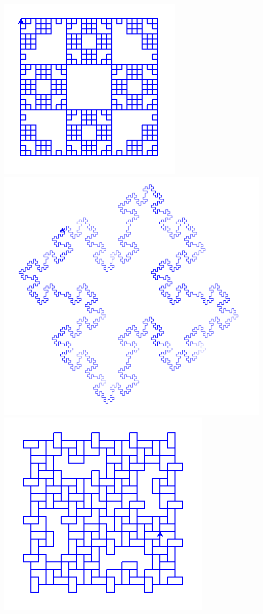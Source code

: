 \documentclass[11pt,class=report,crop=false]{standalone}
\begin{document}
\begin{activite}
\begin{enumerate}
\begin{center}
\includegraphics[scale=\myscale,scale=0.3]{ecran-lsysteme-4}\quad
\includegraphics[scale=\myscale,scale=0.2]{ecran-lsysteme-5}\quad
\includegraphics[scale=\myscale,scale=0.27]{ecran-lsysteme-6}
\end{center}



\end{enumerate}
\end{activite}
\end{document}
